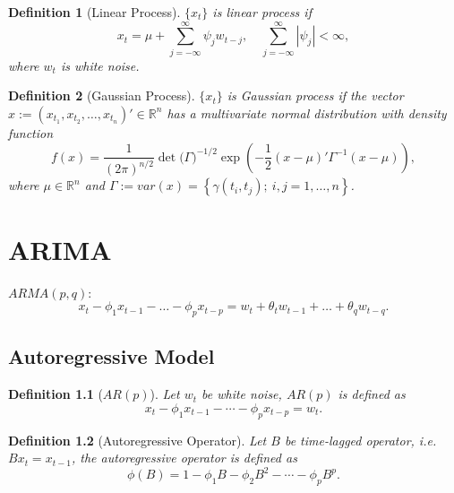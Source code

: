 \documentclass[10pt,titlepage,oneside,openany]{report}
\theoremstyle{remark}
\theoremstyle{plain}
\newtheorem{Definition}{Definition}[section]
\newcommand{\R}{\mathbb{R}}
\numberwithin{equation}{section}
\begin{document}
\begin{Definition}[Linear Process]
	$\{x_t\}$ is linear process if 
	\[
	x_t = \mu + \sum_{j=-\infty}^\infty \psi_j w_{t-j}, \quad \sum_{j=-\infty}^\infty |\psi_j|< \infty,
	\]
	where $w_t$ is white noise.
\end{Definition}

\begin{Definition}[Gaussian Process]
	$\{x_t\}$ is Gaussian process if the vector $x := (x_{t_1}, x_{t_2},\dots, x_{t_n})' \in \R^n$ has a multivariate normal distribution with density function
	\[
	f(x) = \frac{1}{(2\pi)^{n/2}} \det\big(\Gamma\big)^{-1/2} \exp \left(-\frac{1}{2} (x-\mu)' \Gamma^{-1} (x-\mu) \right),
	\]
	where $\mu \in \R^n$ and $\Gamma:= var (x) = \left\{ \gamma(t_i, t_j);\ i,j=1,\dots,n\right\}$.
\end{Definition}

\chapter{ARIMA}
$ARMA(p,q)$: 
\[
x_t - \phi_1 x_{t-1} - \dots - \phi_p x_{t-p} = w_t + \theta_t w_{t-1} + \dots + \theta_q w_{t-q}.
\]

\section{Autoregressive Model}

\begin{Definition}[$AR(p)$]
	Let $w_t$ be white noise, $AR(p)$ is defined as 
	\[
	x_t - \phi_1 x_{t-1} - \cdots - \phi_p x_{t-p} = w_t.
	\]
\end{Definition}

\begin{Definition}[Autoregressive Operator]
	Let $B$ be time-lagged operator, i.e. $Bx_t = x_{t-1}$, the autoregressive operator is defined as
	\[
	\phi(B) = 1-\phi_1 B - \phi_2 B^2 - \cdots - \phi_p B^p.
	\]
\end{Definition}
\end{document}
